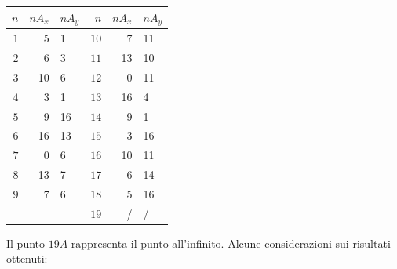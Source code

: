 \documentclass[a4paper,12pt]{tesiinfo}
\begin{document}
\begin{center}
\begin{tabular}{ r r l | r r l}
 $n$ & $nA_x$ & $nA_y$ & $n$ & $nA_x$ & $nA_y$\\
 \hline
 $1$ & 5 & 1 & $10$ & 7 & 11 \\
 $2$ & 6 & 3 & $11$ & 13 & 10\\
 $3$ & 10 & 6 & $12$ & 0 & 11\\
 $4$ & 3 & 1 & $13$ & 16 & 4\\
 $5$ & 9 & 16 & $14$ & 9 & 1\\
 $6$ & 16 & 13 & $15$ & 3 & 16\\
 $7$ & 0 & 6 & $16$ & 10 & 11\\
 $8$ & 13 & 7 & $17$ & 6 & 14\\
 $9$ & 7 & 6 & $18$ & 5 & 16\\
 & & & $19$ & / & /
\end{tabular}
\end{center}
Il punto $19A$ rappresenta il punto all'infinito.
Alcune considerazioni sui risultati ottenuti:
\end{document}
